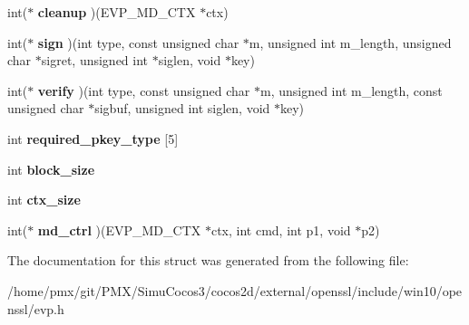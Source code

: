 \begin{DoxyCompactItemize}
int($\ast$ {\bfseries cleanup} )(E\+V\+P\+\_\+\+M\+D\+\_\+\+C\+TX $\ast$ctx)
\item 
\mbox{\label{structenv__md__st_a6c2688ca16aa6280d183f19932a57d3e}} 
int($\ast$ {\bfseries sign} )(int type, const unsigned char $\ast$m, unsigned int m\+\_\+length, unsigned char $\ast$sigret, unsigned int $\ast$siglen, void $\ast$key)
\item 
\mbox{\label{structenv__md__st_a10b15f12475626688692fab5b0e51223}} 
int($\ast$ {\bfseries verify} )(int type, const unsigned char $\ast$m, unsigned int m\+\_\+length, const unsigned char $\ast$sigbuf, unsigned int siglen, void $\ast$key)
\item 
\mbox{\label{structenv__md__st_a508c2571ca6389b14b054c49ba3fe7b3}} 
int {\bfseries required\+\_\+pkey\+\_\+type} \mbox{[}5\mbox{]}
\item 
\mbox{\label{structenv__md__st_ae76b8152ca0ed7e4442d1210ad4bdf88}} 
int {\bfseries block\+\_\+size}
\item 
\mbox{\label{structenv__md__st_a3c34817fb557d912821c8f06ae5945ba}} 
int {\bfseries ctx\+\_\+size}
\item 
\mbox{\label{structenv__md__st_a0f91a62137d598f55b1e7a321ccbf100}} 
int($\ast$ {\bfseries md\+\_\+ctrl} )(E\+V\+P\+\_\+\+M\+D\+\_\+\+C\+TX $\ast$ctx, int cmd, int p1, void $\ast$p2)
\end{DoxyCompactItemize}


The documentation for this struct was generated from the following file\+:\begin{DoxyCompactItemize}
\item 
/home/pmx/git/\+P\+M\+X/\+Simu\+Cocos3/cocos2d/external/openssl/include/win10/openssl/evp.\+h\end{DoxyCompactItemize}
